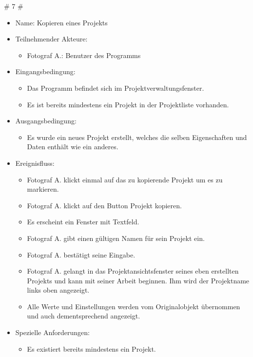 		\# 7 \#
		\begin{itemize}
			\item Name: Kopieren eines Projekts
			\item Teilnehmender Akteure:
			\begin{itemize}
				\item	Fotograf A.: Benutzer des Programms		
			\end{itemize}
			\item Eingangsbedingung:
			\begin{itemize}
				\item	Das Programm befindet sich im Projektverwaltungsfenster.
				\item Es ist bereits mindestens ein Projekt in der Projektliste vorhanden.			
			\end{itemize}
			\item Ausgangsbedingung:
			\begin{itemize}
				\item	Es wurde ein neues Projekt erstellt, welches die selben Eigenschaften und Daten enthält wie ein anderes.	
			\end{itemize}
			\item Ereignisfluss:
			\begin{itemize}
				\item Fotograf A. klickt einmal auf das zu kopierende Projekt um es zu markieren.
				\item Fotograf A. klickt auf den Button Projekt kopieren.
				\item Es erscheint ein Fenster mit Textfeld.
				\item Fotograf A. gibt einen gültigen Namen für sein Projekt ein.
				\item Fotograf A. bestätigt seine Eingabe.
				\item Fotograf A. gelangt in das Projektansichtsfenster seines eben erstellten Projekts und kann mit seiner Arbeit beginnen. Ihm wird der Projektname links oben angezeigt.
				\item Alle Werte und Einstellungen werden vom Originalobjekt übernommen und auch dementsprechend angezeigt.
			\end{itemize}
			\item Spezielle Anforderungen:
			\begin{itemize}
				\item	Es existiert bereits mindestens ein Projekt.		
			\end{itemize}			
		\end{itemize}


